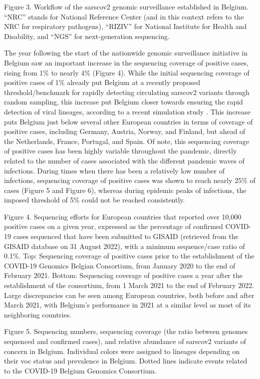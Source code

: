 Figure 3. Workflow of the \gls{sarscov2} genomic surveillance established in Belgium.
``NRC'' stands for National Reference Center (and in this context refers to the NRC for respiratory pathogens), ``RIZIV'' for National Institute for Health and Disability, and ``NGS'' for next-generation sequencing.


The year following the start of the nationwide genomic surveillance initiative in Belgium saw an important increase in the sequencing coverage of positive cases, rising from 1\% to nearly 4\% (Figure 4).
While the initial sequencing coverage of positive cases of 1\% already put Belgium at a recently proposed threshold/benchmark for rapidly detecting circulating \gls{sarscov2} variants through random sampling, this increase put Belgium closer towards ensuring the rapid detection of viral lineages, according to a recent simulation study \citep{brito2022global}.
This increase puts Belgium just below several other European countries in terms of coverage of positive cases, including Germany, Austria, Norway, and Finland, but ahead of the Netherlands, France, Portugal, and Spain.
Of note, this sequencing coverage of positive cases has been highly variable throughout the pandemic, directly related to the number of cases associated with the different pandemic waves of infections.
During times when there has been a relatively low number of infections, sequencing coverage of positive cases was shown to reach nearly 25\% of cases (Figure 5 and Figure 6), whereas during epidemic peaks of infections, the imposed threshold of 5\% could not be reached consistently.


Figure 4. Sequencing efforts for European countries that reported over 10,000 positive cases on a given year, expressed as the percentage of confirmed COVID-19 cases sequenced that have been submitted to GISAID (retrieved from the GISAID database on 31 August 2022), with a minimum sequence/case ratio of 0.1\%.
Top: Sequencing coverage of positive cases prior to the establishment of the COVID-19 Genomics Belgian Consortium, from January 2020 to the end of February 2021.
Bottom: Sequencing coverage of positive cases a year after the establishment of the consortium, from 1 March 2021 to the end of February 2022.
Large discrepancies can be seen among European countries, both before and after March 2021, with Belgium's performance in 2021 at a similar level as most of its neighboring countries.


Figure 5. Sequencing numbers, sequencing coverage (the ratio between genomes sequenced and confirmed cases), and relative abundance of \gls{sarscov2} variants of concern in Belgium.
Individual colors were assigned to lineages depending on their \gls{voc} status and prevalence in Belgium.
Dotted lines indicate events related to the COVID-19 Belgium Genomics Consortium.



